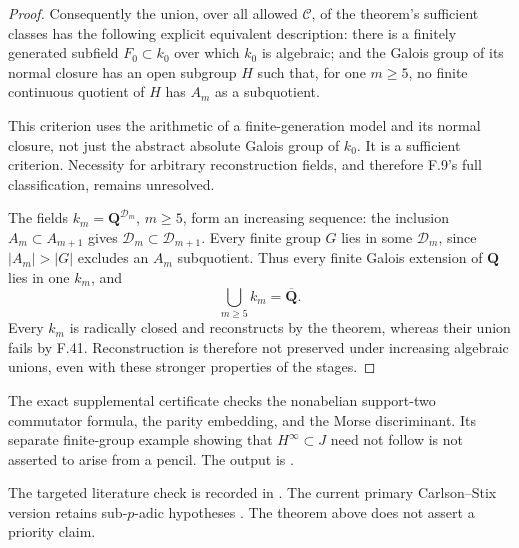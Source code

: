 \begin{proof}
Consequently the union, over all allowed \(\mathcal C\), of the theorem's sufficient classes has the following explicit equivalent description: there is a finitely generated subfield \(F_0\subset k_0\) over which \(k_0\) is algebraic; and the Galois group of its normal closure has an open subgroup \(H\) such that, for one \(m\ge5\), no finite continuous quotient of \(H\) has \(A_m\) as a subquotient.

This criterion uses the arithmetic of a finite-generation model and its normal closure, not just the abstract absolute Galois group of \(k_0\). It is a sufficient criterion. Necessity for arbitrary reconstruction fields, and therefore F.9's full classification, remains unresolved.

The fields \(k_m=\mathbf Q^{\mathcal D_m}\), \(m\ge5\),
form an increasing sequence: the inclusion
\(A_m\subset A_{m+1}\) gives
\(\mathcal D_m\subset\mathcal D_{m+1}\).
Every finite group \(G\) lies in some \(\mathcal D_m\),
since \(|A_m|>|G|\) excludes an \(A_m\) subquotient.
Thus every finite Galois extension of \(\mathbf Q\)
lies in one \(k_m\), and
\[
                    \bigcup_{m\ge5}k_m=\overline{\mathbf Q}.
                    \tag{F.44.18}
\]
Every \(k_m\) is radically closed and reconstructs by
the theorem, whereas their union fails by F.41.
Reconstruction is therefore not preserved under
increasing algebraic unions, even with these stronger
properties of the stages.

\end{proof}

The exact supplemental certificate
checks the nonabelian support-two commutator formula,
the parity embedding, and the Morse discriminant.
Its separate finite-group example showing that
\(H^\infty\subset J\) need not follow is not asserted
to arise from a pencil.
The output is
.

The targeted literature check is recorded in
. The current primary
Carlson--Stix version retains sub-$p$-adic hypotheses
\citep[Theorems~A--D and Proposition~C]{F_CS2026}.
The theorem above does not assert a priority claim.
